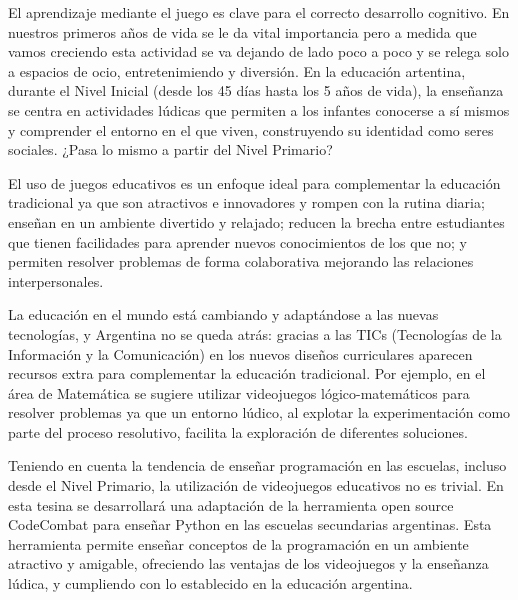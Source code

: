 El aprendizaje mediante el juego es clave para el correcto desarrollo cognitivo. En nuestros primeros años de vida se le da vital importancia pero a medida que vamos creciendo esta actividad se va dejando de lado poco a poco y se relega solo a espacios de ocio, entretenimiendo y diversión. En la educación artentina, durante el Nivel Inicial (desde los 45 días hasta los 5 años de vida), la enseñanza se centra en actividades lúdicas que permiten a los infantes conocerse a sí mismos y comprender el entorno en el que viven, construyendo su identidad como seres sociales. ¿Pasa lo mismo a partir del Nivel Primario?

El uso de juegos educativos es un enfoque ideal para complementar la educación tradicional ya que son atractivos e innovadores y rompen con la rutina diaria; enseñan en un ambiente divertido y relajado; reducen la brecha entre estudiantes que tienen facilidades para aprender nuevos conocimientos de los que no; y permiten resolver problemas de forma colaborativa mejorando las relaciones interpersonales.

La educación en el mundo está cambiando y adaptándose a las nuevas tecnologías, y Argentina no se queda atrás: gracias a las TICs (Tecnologías de la Información y la Comunicación) en los nuevos diseños curriculares aparecen recursos extra para complementar la educación tradicional. Por ejemplo, en el área de Matemática \cite{educacionInicial} se sugiere utilizar videojuegos lógico-matemáticos para resolver problemas ya que un entorno lúdico, al explotar la experimentación como parte del proceso resolutivo, facilita la exploración de diferentes soluciones.

Teniendo en cuenta la tendencia de enseñar programación en las escuelas, incluso desde el Nivel Primario, la utilización de videojuegos educativos no es trivial. En esta tesina se desarrollará una adaptación de la herramienta open source CodeCombat para enseñar Python en las escuelas secundarias argentinas. Esta herramienta permite enseñar conceptos de la programación en un ambiente atractivo y amigable, ofreciendo las ventajas de los videojuegos y la enseñanza lúdica, y cumpliendo con lo establecido en la educación argentina. 